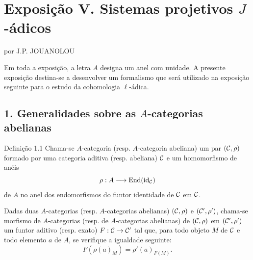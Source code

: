 \section*{Exposição V. Sistemas projetivos $J$-ádicos}
\begin{center}por J.P. JOUANOLOU\end{center}

Em toda a exposição, a letra $A$ designa um anel com unidade. A presente exposição destina-se a desenvolver um formalismo que será utilizado na exposição seguinte para o estudo da cohomologia $\ell$-ádica.

\subsection*{1. Generalidades sobre as $A$-categorias abelianas}

\begin{statement}{Definição 1.1}
Chama-se $A$-categoria (resp. $A$-categoria abeliana) um par $(\mathcal C,\rho)$ formado por uma categoria aditiva (resp. abeliana) $\mathcal C$ e um homomorfismo de anéis
\[
\rho:A\longrightarrow \operatorname{End}(\operatorname{id}_{\mathcal C})
\]
de $A$ no anel dos endomorfismos do funtor identidade de $\mathcal C$ em $\mathcal C$.
\end{statement}

Dadas duas $A$-categorias (resp. $A$-categorias abelianas) $(\mathcal C,\rho)$ e $(\mathcal C',\rho')$, chama-se morfismo de $A$-categorias (resp. de $A$-categorias abelianas) de $(\mathcal C,\rho)$ em $(\mathcal C',\rho')$ um funtor aditivo (resp. exato) $F:\mathcal C\to\mathcal C'$ tal que, para todo objeto $M$ de $\mathcal C$ e todo elemento $a$ de $A$, se verifique a igualdade seguinte:
\[
F(\rho(a)_M)=\rho'(a)_{F(M)}.
\]


